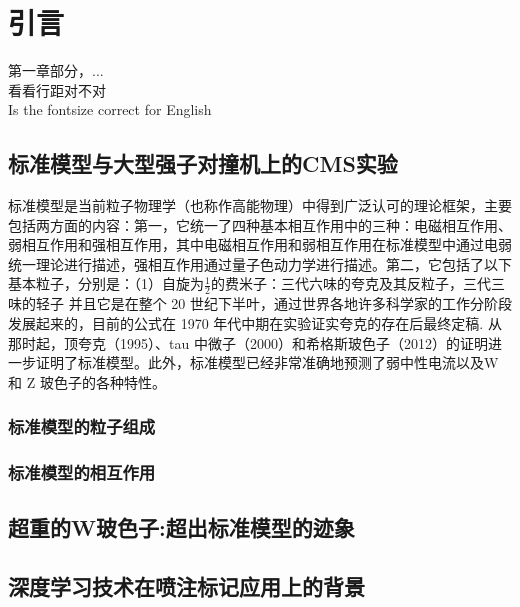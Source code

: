 \chapter{引言}
\label{chap1}
\fontsize{12bp}{14.4pt}

第一章\cite{marolf_transcending_2020}部分\cite{coleman_black_1988}，...\\
看看行距对不对\\
Is the fontsize correct for English

\section{标准模型与大型强子对撞机上的CMS实验}
标准模型是当前粒子物理学（也称作高能物理）中得到广泛认可的理论框架，主要包括两方面的内容：第一，它统一了四种基本相互作用中的三种：电磁相互作用、弱相互作用和强相互作用，其中电磁相互作用和弱相互作用在标准模型中通过电弱统一理论进行描述，强相互作用通过量子色动力学进行描述。第二，它包括了以下基本粒子，分别是：（1）自旋为$\frac{1}{2}$的费米子：三代六味的夸克及其反粒子，三代三味的轻子
并且它是在整个 20 世纪下半叶，通过世界各地许多科学家的工作分阶段发展起来的，目前的公式在 1970 年代中期在实验证实夸克的存在后最终定稿. 从那时起，顶夸克（1995）、tau 中微子（2000）和希格斯玻色子（2012）的证明进一步证明了标准模型。此外，标准模型已经非常准确地预测了弱中性电流以及W 和 Z 玻色子的各种特性。
\subsection{标准模型的粒子组成}
\subsection{标准模型的相互作用}
\section{超重的W玻色子:超出标准模型的迹象}

\section{深度学习技术在喷注标记应用上的背景}